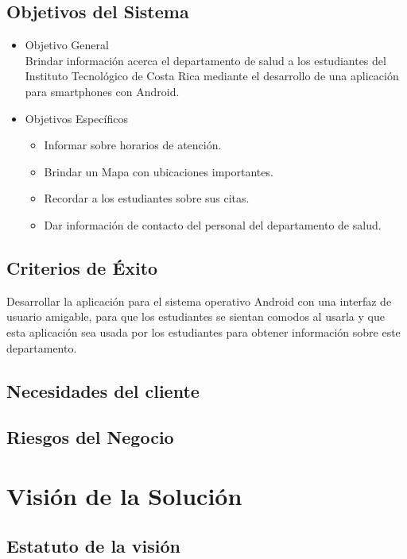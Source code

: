\documentclass[11pt]{article}
\begin{document}
\subsection{Objetivos del Sistema}

\begin{itemize}
\item{Objetivo General}
\\[0.1in]
Brindar informaci\'on acerca el departamento de salud a los estudiantes del Instituto Tecnol\'ogico de Costa Rica mediante el desarrollo de una aplicaci\'on para smartphones con Android.

\item{Objetivos Espec\'ificos}
\begin{itemize}
	\item{Informar sobre horarios de atenci\'on.}
	\item{Brindar un Mapa con ubicaciones importantes.}
	\item{Recordar a los estudiantes sobre sus citas.}
	\item{Dar informaci\'on de contacto del personal del departamento de salud.}
\end{itemize}
\end{itemize}

\subsection{Criterios de \'Exito}

Desarrollar la aplicaci\'on para el sistema operativo Android con una interfaz de usuario amigable, para que los estudiantes se sientan comodos al usarla y que esta aplicaci\'on sea usada por los estudiantes para obtener informaci\'on sobre este departamento.

\subsection{Necesidades del cliente}



\subsection{Riesgos del Negocio}

\section{Visi\'on de la Soluci\'on}

\subsection{Estatuto de la visi\'on}
\end{document}
